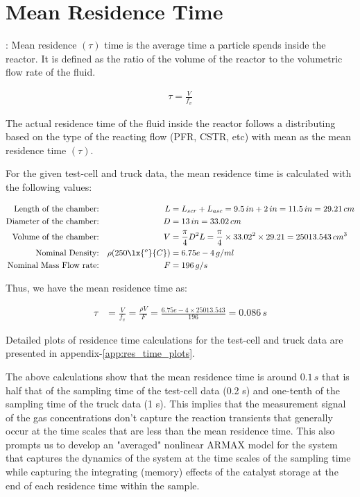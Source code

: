 \section{Mean Residence Time}

: Mean residence $(\tau)$ time is the average time a particle
spends inside the reactor. It is defined as the ratio of the volume of the
reactor to the volumetric flow rate of the fluid.

\begin{align}
    \tau = \frac{V}{f_v}
\end{align}

The actual residence time of the fluid inside the reactor follows a distributing
based on the type of the reacting flow (PFR, CSTR, etc) with mean as the mean
residence time $(\tau)$.

For the given test-cell and truck data, the mean residence time is calculated
with the following values:

\begin{align*}
    \text{Length of the chamber:}&&
    L &= L_{scr} + L_{asc} = 9.5 \, in  + 2 \, in = 11.5 \, in = 29.21 \, cm\\
    \text{Diameter of the chamber:} &&
    D &= 13 \, in = 33.02 \, cm\\
    \text{Volume of the chamber:} &&
    V &= \frac{\pi}{4} D^2 L = \frac{\pi}{4} \times 33.02^2 \times 29.21 = 25013.543 \, cm^3\\
    \text{Nominal Density:} &&
    \rho(250 \lx{^o}{C}) &= 6.75e-4 \, g/ml\\
    \text{Nominal Mass Flow rate:} &&
    F &= 196 \, g/s\\
\end{align*}

Thus, we have the mean residence time as:

\begin{align}
    \tau &= \frac{V}{f_v} = \frac{\rho V}{F} = \frac{6.75e-4 \times 25013.543}{196} = 0.086 \, s
\end{align}

Detailed plots of residence time calculations for the test-cell and truck data
are presented in appendix-\ref{app:res_time_plots}.

The above calculations show that the mean residence time is around $0.1 \, s$
that is half that of the sampling time of the test-cell data (0.2 s) and
one-tenth of the sampling time of the truck data (1 s). This implies that the
measurement signal of the gas concentrations don't capture the reaction
transients that generally occur at the time scales  that are less than the mean
residence time. This also prompts us to develop an "averaged" nonlinear ARMAX
model for the system that captures the dynamics of the system at the time scales
of the sampling time while capturing the integrating (memory) effects of the
catalyst storage at the end of each residence time within the sample.

